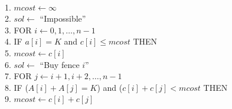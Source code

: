 \begin{algt}
\\
1.\settowidth{\algbackindent}{1.}\hspace*{-\algbackindent}\hspace*{0.2in} $mcost\leftarrow\infty$\\
2.\settowidth{\algbackindent}{2.}\hspace*{-\algbackindent}\hspace*{0.2in} $sol\leftarrow$ ``Impossible''\\
3.\settowidth{\algbackindent}{3.}\hspace*{-\algbackindent}\hspace*{0.2in} FOR $i\leftarrow 0,1,\ldots,n-1$\\
4.\settowidth{\algbackindent}{4.}\hspace*{-\algbackindent}\hspace*{0.2in}\hspace*{0.2in} IF $a[i]=K$ and $c[i]\leq mcost$ THEN\\
5.\settowidth{\algbackindent}{5.}\hspace*{-\algbackindent}\hspace*{0.2in}\hspace*{0.2in}\hspace*{0.2in} $mcost\leftarrow c[i]$\\
6.\settowidth{\algbackindent}{6.}\hspace*{-\algbackindent}\hspace*{0.2in}\hspace*{0.2in}\hspace*{0.2in} $sol\leftarrow$ ``Buy fence $i$''\\
7.\settowidth{\algbackindent}{7.}\hspace*{-\algbackindent}\hspace*{0.2in}\hspace*{0.2in} FOR $j\leftarrow i+1,i+2,\ldots,n-1$\\
8.\settowidth{\algbackindent}{8.}\hspace*{-\algbackindent}\hspace*{0.2in}\hspace*{0.2in}\hspace*{0.2in} IF ($A[i] + A[j] = K$) and ($c[i]+c[j]<mcost$ THEN\\
9.\settowidth{\algbackindent}{9.}\hspace*{-\algbackindent}\hspace*{0.2in}\hspace*{0.2in}\hspace*{0.2in}\hspace*{0.2in} $mcost\leftarrow c[i]+c[j]$\\

\end{algt}
